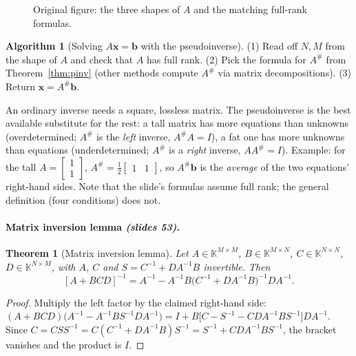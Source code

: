 \documentclass[11pt,a4paper]{article}
\newcommand{\K}{\mathbb{K}}
\newcommand{\Her}{^{\mathsf{H}}}
\newcommand{\pinv}{^{\#}}
\newcommand{\slides}[1]{\texorpdfstring{\emph{(slides #1)}}{(slides #1)}}
\theoremstyle{definition}
\newtheorem{algorithm}[definition]{Algorithm}
\theoremstyle{plain}
\newtheorem{theorem}[definition]{Theorem}
\begin{document}
\begin{figure}[ht]
\centering
{}
\caption{Original figure: the three shapes of $A$ and the matching full-rank formulas.}
\end{figure}

\begin{algorithm}[Solving $A\mathbf x=\mathbf b$ with the pseudoinverse]
(1) Read off $N,M$ from the shape of $A$ and check that $A$ has full rank. (2) Pick the formula for $A\pinv$ from Theorem~\ref{thm:pinv} (other methods compute $A\pinv$ via matrix decompositions). (3) Return $\mathbf x=A\pinv\mathbf b$.
\end{algorithm}

\begin{intuition}
An ordinary inverse needs a square, lossless matrix. The pseudoinverse is the best available substitute for the rest: a tall matrix has more equations than unknowns (overdetermined; $A\pinv$ is the \emph{left} inverse, $A\pinv A=I$), a fat one has more unknowns than equations (underdetermined; $A\pinv$ is a \emph{right} inverse, $AA\pinv=I$). Example: for the tall $A=\begin{bmatrix}1\\1\end{bmatrix}$, $A\pinv=\tfrac12\begin{bmatrix}1&1\end{bmatrix}$, so $A\pinv\mathbf b$ is the \emph{average} of the two equations' right-hand sides. Note that the slide's formulas assume full rank; the general definition (four conditions) does not.
\end{intuition}

\paragraph{Matrix inversion lemma \slides{53}.}
\begin{theorem}[Matrix inversion lemma]\label{thm:mil}
Let $A\in\K^{M\times M}$, $B\in\K^{M\times N}$, $C\in\K^{N\times N}$, $D\in\K^{N\times M}$, with $A$, $C$ and $S=C^{-1}+DA^{-1}B$ invertible. Then
\[
[A+BCD]^{-1}=A^{-1}-A^{-1}B\big(C^{-1}+DA^{-1}B\big)^{-1}DA^{-1}.
\]
\end{theorem}
\begin{proof}
Multiply the left factor by the claimed right-hand side:
$(A+BCD)\big(A^{-1}-A^{-1}BS^{-1}DA^{-1}\big)=I+B\big[C-S^{-1}-CDA^{-1}BS^{-1}\big]DA^{-1}$.
Since $C=CSS^{-1}=C(C^{-1}+DA^{-1}B)S^{-1}=S^{-1}+CDA^{-1}BS^{-1}$, the bracket vanishes and the product is $I$.
\end{proof}
\end{document}

